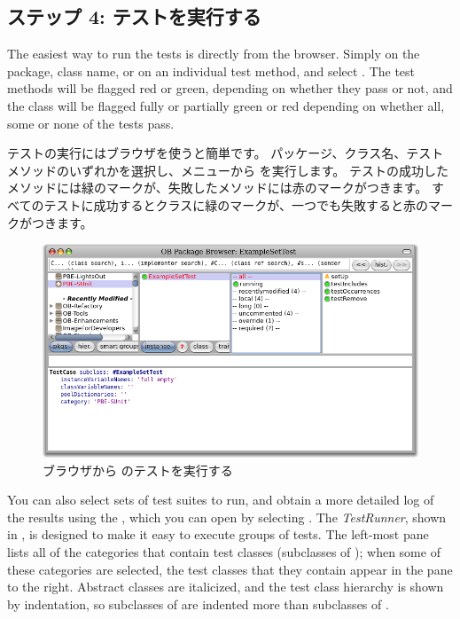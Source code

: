 \documentclass[a4paper,10pt,twoside]{book}
\begin{document}
{\subsection{ステップ 4: テストを実行する}

The easiest way to run the tests is directly from the browser.  Simply \actclick on the package, class name, or on an individual test method, and select .
The test methods will be flagged red or green, depending on whether they pass or not, and the class will be flagged fully or partially green or red depending on whether all, some or none of the tests pass.
\fi

テストの実行にはブラウザを使うと簡単です。
パッケージ、クラス名、テストメソッドのいずれかを選択し、メニューから  を実行します。
テストの成功したメソッドには緑のマークが、失敗したメソッドには赤のマークがつきます。
すべてのテストに成功するとクラスに緑のマークが、一つでも失敗すると赤のマークがつきます。

\begin{figure}[tbh]
  \begin{center}
	\includegraphics[width=\linewidth]{browser-tests}
	\caption{ブラウザから \sunit のテストを実行する}
  \end{center}
\end{figure}


You can also select sets of test suites to run, and obtain a more detailed log of the results using the \sunit {}, which you can open by selecting .
The \emph{TestRunner}, shown in , is designed to make it easy  to execute groups of tests.
The left-most pane lists all of the categories that contain test classes (\ie  subclasses of ); when some of these categories are selected, the test classes that they contain appear in the pane to the right.
Abstract classes are italicized, and the test class hierarchy is shown by indentation, so subclasses of  are indented more than subclasses of .
\fi

}
\end{document}
